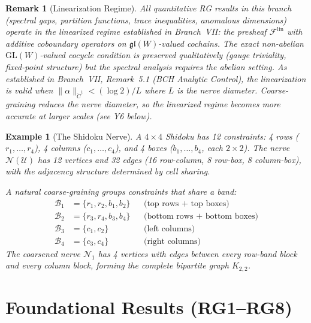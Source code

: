 \documentclass[11pt,letterpaper]{article}
\newtheorem{example}[conjecture]{Example}
\newtheorem{remark}[conjecture]{Remark}
\newcommand{\Cech}{\check{C}}
\newcommand{\sheaf}{\mathcal{F}}
\newcommand{\cover}{\mathcal{U}}
\newcommand{\nerve}{\mathcal{N}}
\newcommand{\block}{\mathcal{B}}
\begin{document}
\begin{remark}[Linearization Regime]\label{rem:rg_linearization}
All quantitative RG results in this branch (spectral gaps, 
partition functions, trace inequalities, anomalous dimensions) 
operate in the linearized regime established in Branch~VII: the 
presheaf $\sheaf^{\mathrm{lin}}$ with additive coboundary operators 
on $\mathfrak{gl}(W)$-valued cochains. The exact non-abelian 
$\mathrm{GL}(W)$-valued cocycle condition is preserved qualitatively 
(gauge triviality, fixed-point structure) but the spectral analysis 
requires the abelian setting. As established in Branch~VII, 
Remark~5.1 (BCH Analytic Control), the linearization is valid when 
$\|\alpha\|_{\Cech^1} < (\log 2) / L$ where $L$ is the nerve 
diameter. Coarse-graining \emph{reduces} the nerve diameter, so 
the linearized regime becomes \emph{more} accurate at larger scales 
(see Y6 below).
\end{remark}

\begin{example}[The Shidoku Nerve]\label{ex:shidoku_nerve}
A $4 \times 4$ Shidoku has 12 constraints: 4 rows ($r_1, \ldots, 
r_4$), 4 columns ($c_1, \ldots, c_4$), and 4 boxes ($b_1, \ldots, 
b_4$, each $2 \times 2$). The nerve $\nerve(\cover)$ has 12 vertices 
and 32 edges (16 row-column, 8 row-box, 8 column-box), with the 
adjacency structure determined by cell sharing.

A natural coarse-graining groups constraints that share a band:
\begin{align*}
    \block_1 &= \{r_1, r_2, b_1, b_2\} 
    && \text{(top rows + top boxes)} \\
    \block_2 &= \{r_3, r_4, b_3, b_4\} 
    && \text{(bottom rows + bottom boxes)} \\
    \block_3 &= \{c_1, c_2\} && \text{(left columns)} \\
    \block_4 &= \{c_3, c_4\} && \text{(right columns)}
\end{align*}
The coarsened nerve $\nerve_1$ has 4 vertices with edges between 
every row-band block and every column block, forming the complete 
bipartite graph $K_{2,2}$.
\end{example}

\newpage
\part{Foundational Results (RG1--RG8)}
\end{document}
